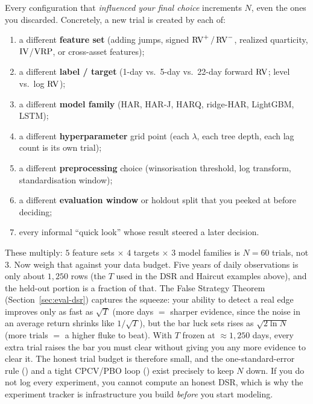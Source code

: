 \begin{keyidea}
Every configuration that \emph{influenced your final choice} increments $N$, even the ones you discarded. Concretely, a new trial is created by each of:
\begin{enumerate}[nosep]
  \item a different \textbf{feature set} (adding jumps, signed $\operatorname{RV}^{+}/\operatorname{RV}^{-}$, realized quarticity, $\operatorname{IV}$/$\operatorname{VRP}$, or cross-asset features);
  \item a different \textbf{label / target} (1-day vs.\ 5-day vs.\ 22-day forward $\operatorname{RV}$; level vs.\ log $\operatorname{RV}$);
  \item a different \textbf{model family} (HAR, HAR-J, HARQ, ridge-HAR, LightGBM, LSTM);
  \item a different \textbf{hyperparameter} grid point (each $\lambda$, each tree depth, each lag count is its own trial);
  \item a different \textbf{preprocessing} choice (winsorisation threshold, log transform, standardisation window);
  \item a different \textbf{evaluation window} or holdout split that you peeked at before deciding;
  \item every informal ``quick look'' whose result steered a later decision.
\end{enumerate}
These multiply: $5$ feature sets $\times$ $4$ targets $\times$ $3$ model families is $N = 60$ trials, not $3$.
Now weigh that against your data budget. Five years of daily observations is only about $1{,}250$ rows (the $T$ used in the DSR and Haircut examples above), and the held-out portion is a fraction of that.
The False Strategy Theorem (Section~\ref{sec:eval-dsr}) captures the squeeze: your ability to detect a real edge improves only as fast as $\sqrt{T}$ (more days $=$ sharper evidence, since the noise in an average return shrinks like $1/\sqrt{T}$), but the bar luck sets rises as $\sqrt{2\ln N}$ (more trials $=$ a higher fluke to beat).
With $T$ frozen at $\approx 1{,}250$ days, every extra trial raises the bar you must clear without giving you any more evidence to clear it.
The honest trial budget is therefore small, and the one-standard-error rule () and a tight CPCV/PBO loop () exist precisely to keep $N$ down.
If you do not log every experiment, you cannot compute an honest DSR, which is why the experiment tracker is infrastructure you build \emph{before} you start modeling.
\end{keyidea}

